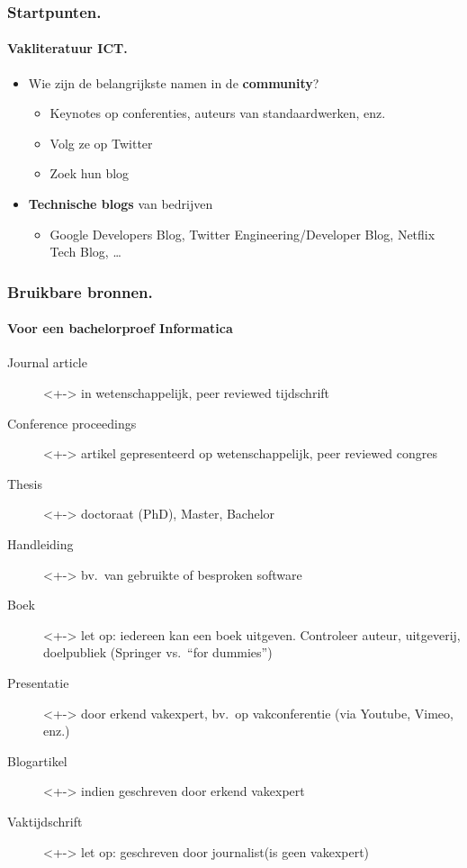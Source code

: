 \documentclass[aspectratio=169]{beamer}
\begin{document}
\begin{frame}
  \frametitle{Startpunten.}
  \framesubtitle{Vakliteratuur ICT.}

  \begin{itemize}
    \item<+-> Wie zijn de belangrijkste namen in de \textbf{community}?
    \begin{itemize}
      \item Keynotes op conferenties, auteurs van standaardwerken, enz.
      \item Volg ze op Twitter
      \item Zoek hun blog
    \end{itemize}
    \item<+-> \textbf{Technische blogs} van bedrijven
    \begin{itemize}
      \item Google Developers Blog, Twitter Engineering/Developer Blog, Netflix Tech Blog, \dots
    \end{itemize}
  \end{itemize}
\end{frame}


\begin{frame}
  \frametitle{Bruikbare bronnen.}
  \framesubtitle{Voor een bachelorproef Informatica}

  \begin{description}
    \item[Journal article]<+-> in wetenschappelijk, peer reviewed tijdschrift
    \item[Conference proceedings]<+-> artikel gepresenteerd op wetenschappelijk, peer reviewed congres
    \item[Thesis]<+-> doctoraat (PhD), Master, Bachelor
    \item[Handleiding]<+-> bv.\ van gebruikte of besproken software
    \item[Boek]<+-> let op: iedereen kan een boek uitgeven. Controleer auteur, uitgeverij, doelpubliek (Springer vs.\ ``for dummies'')
    \item[Presentatie]<+-> door erkend vakexpert, bv.\ op vakconferentie (via Youtube, Vimeo, enz.)
    \item[Blogartikel]<+-> indien geschreven door erkend vakexpert
    \item[Vaktijdschrift]<+-> let op: geschreven door journalist\linebreak(is geen vakexpert)
  \end{description}
\end{frame}
\end{document}
